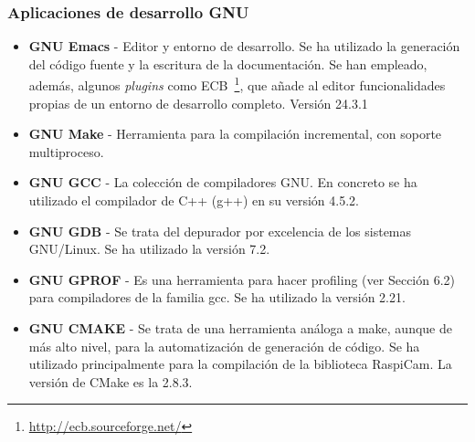 \subsubsection{Aplicaciones de desarrollo GNU}
\begin{itemize}
\item \textbf{GNU Emacs} - Editor y entorno de desarrollo. Se ha utilizado la generación del código fuente y la escritura de la documentación.  Se han empleado, además, algunos \textit{plugins} como
  ECB~\footnote{\url{http://ecb.sourceforge.net/}}, que añade al editor funcionalidades propias de un entorno
  de desarrollo completo. Versión 24.3.1
\item \textbf{GNU Make} - Herramienta para la compilación incremental, con soporte multiproceso.
\item \textbf{GNU GCC} - La colección de compiladores GNU. En concreto se ha utilizado el compilador de C++ (g++) en su versión 4.5.2.
\item \textbf{GNU GDB} - Se trata del depurador por excelencia de los sistemas GNU/Linux. Se ha utilizado la versión 7.2.
\item \textbf{GNU GPROF} - Es una herramienta para hacer profiling (ver Sección 6.2) para compiladores de la familia gcc. Se ha utilizado la versión 2.21.
\item \textbf{GNU CMAKE} - Se trata de una herramienta análoga a make, aunque de más alto nivel, para la automatización de generación de código. Se ha utilizado principalmente para la compilación de la biblioteca RaspiCam. La versión de CMake es la 2.8.3. 
\end{itemize}

